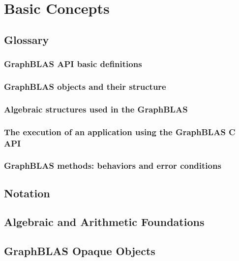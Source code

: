 \chapter{Basic Concepts}
\label{Chp:Concepts}

\section{Glossary}

\subsection{GraphBLAS API basic definitions}

\subsection{GraphBLAS objects and their structure}

\subsection{Algebraic structures used in the GraphBLAS}

\subsection{The execution of an application using the GraphBLAS C API}

\subsection{GraphBLAS methods: behaviors and error conditions}


\section{Notation}


\section{Algebraic and Arithmetic Foundations}


\section{GraphBLAS Opaque Objects}



